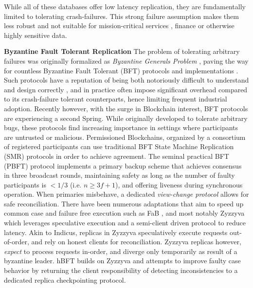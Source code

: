 While all of these databases offer low latency replication, they are fundamentally limited to tolerating crash-failures. This strong failure assumption makes them less robust and not suitable for mission-critical services \cite{Abdollah2007}, finance or otherwise highly sensitive data.

\textbf{Byzantine Fault Tolerant Replication} 
 The problem of tolerating arbitrary failures was originally formalized as \textit{Byzantine Generals Problem} \cite{lamport2019byzantine}, paving the way for countless Byzantine Fault Tolerant (BFT) protocols and implementations \cite{castro1999practical, martin2006fast, kotla2007zyzzyva, pires2018generalized, bessani2014state, lamport2011byzantizing, arun2019ezbft, malkhi2019flexible, duan2014hbft, yin2003separating}. Such protocols have a reputation of being  both notoriously difficult to understand and design correctly \cite{abraham2017revisiting, abraham2018revisiting, shrestha2019revisiting}, and in practice often impose significant overhead compared to its crash-failure tolerant counterparts, hence limiting frequent industrial adoption.
Recently however, with the surge in Blockchain interest, BFT protocols are experiencing a second Spring. While originally developed to tolerate arbitrary bugs, these protocols find increasing importance in settings where participants are untrusted or malicious. Permissioned Blockchains, organized by a consortium of registered participants can use traditional BFT State Machine Replication (SMR) protocols in order to achieve agreement. 
The seminal practical BFT (PBFT) protocol \cite{castro1999practical} implements a primary backup scheme that achieves consensus in three broadcast rounds, maintaining safety as long as the number of faulty participants is $<1/3$ (i.e. $n\geq 3f+1$), and offering liveness during synchronous operation. When primaries misbehave, a dedicated \textit{view-change protocol} allows for safe reconciliation. There have been numerous adaptations that aim to speed up common case and failure free execution such as FaB \cite{martin2006fast}, and most notably Zyzzyva \cite{kotla2007zyzzyva} which leverages speculative execution and a semi-client driven protocol to reduce latency. Akin to Indicus, replicas in Zyzzyva speculatively execute requests out-of-order, and rely on honest clients for reconciliation. Zyzzyva replicas however, \textit{expect} to process requests in-order, and diverge only temporarily as result of a byzantine leader. hBFT builds on Zyzzyva and attempts to improve faulty case behavior by returning the client responsibility of detecting inconsistencies to a dedicated replica checkpointing protocol. 
